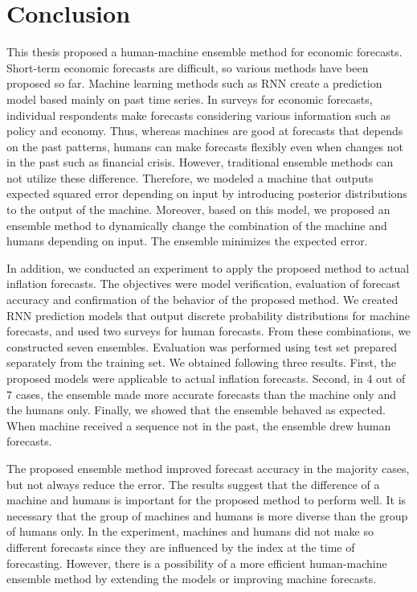 \documentclass[../main.tex]{subfiles}
\begin{document}
\section{Conclusion}
\label{sec: Conclusion}

This thesis proposed a human-machine ensemble method for economic forecasts.
Short-term economic forecasts are difficult, so various methods have been proposed so far.
Machine learning methods such as RNN create a prediction model based mainly on past time series.
In surveys for economic forecasts, individual respondents make forecasts considering various information such as policy and economy.
Thus, whereas machines are good at forecasts that depends on the past patterns, humans can make forecasts flexibly even when changes not in the past such as financial crisis.
However, traditional ensemble methods can not utilize these difference.
Therefore, we modeled a machine that outputs expected squared error depending on input by introducing posterior distributions to the output of the machine.
Moreover, based on this model, we proposed an ensemble method to dynamically change the combination of the machine and humans depending on input.
The ensemble minimizes the expected error.

In addition, we conducted an experiment to apply the proposed method to actual inflation forecasts.
The objectives were model verification, evaluation of forecast accuracy and confirmation of the behavior of the proposed method.
We created RNN prediction models that output discrete probability distributions for machine forecasts, and used two surveys for human forecasts.
From these combinations, we constructed seven ensembles.
Evaluation was performed using test set prepared separately from the training set.
We obtained following three results.
First, the proposed models were applicable to actual inflation forecasts.
Second, in 4 out of 7 cases, the ensemble made more accurate forecasts than the machine only and the humans only.
Finally, we showed that the ensemble behaved as expected.
When machine received a sequence not in the past, the ensemble drew human forecasts.

The proposed ensemble method improved forecast accuracy in the majority cases, but not always reduce the error.
The results suggest that the difference of a machine and humans is important for the proposed method to perform well.
It is necessary that the group of machines and humans is more diverse than the group of humans only.
In the experiment, machines and humans did not make so different forecasts since they are influenced by the index at the time of forecasting.
However, there is a possibility of a more efficient human-machine ensemble method by extending the models or improving machine forecasts.
\end{document}
